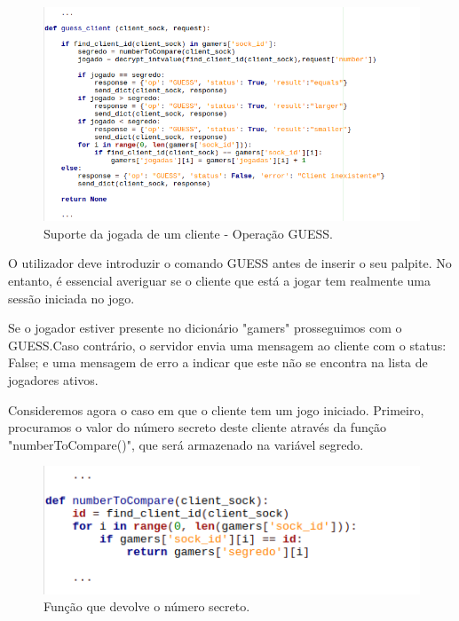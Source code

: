 \documentclass{report}
\begin{document}
\begin{figure}[H]
        \centering
        \includegraphics[scale=0.65]{guess_client}      
        \caption{Suporte da jogada de um cliente - Operação GUESS.}
\end{figure}
O utilizador deve introduzir o comando GUESS antes de inserir o seu palpite. No entanto, é essencial averiguar se o cliente que está a jogar tem realmente uma sessão iniciada no jogo.

Se o jogador estiver presente no dicionário "gamers" prosseguimos com o GUESS.Caso contrário, o servidor envia uma mensagem ao cliente com o status: False; e uma mensagem de erro a indicar que este não se encontra na lista de jogadores ativos.

Consideremos agora o caso em que o cliente tem um jogo iniciado. Primeiro, procuramos o valor do número secreto deste cliente através da função "numberToCompare()", que será armazenado na variável segredo. 
\begin{figure}[H]
        \centering
        \includegraphics[scale=0.65]{numberToCompare}   
        \caption{Função que devolve o número secreto.}
\end{figure}
\end{document}
